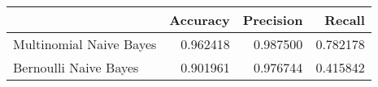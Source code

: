 \begin{tabular}{lrrr}
\toprule
 & Accuracy & Precision & Recall \\
\midrule
Multinomial Naive Bayes & 0.962418 & 0.987500 & 0.782178 \\
Bernoulli Naive Bayes & 0.901961 & 0.976744 & 0.415842 \\
\bottomrule
\end{tabular}
